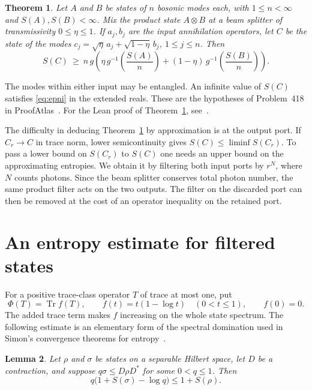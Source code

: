 \documentclass[11pt,letterpaper]{article}
\newtheorem{theorem}{Theorem}[section]
\newtheorem{lemma}[theorem]{Lemma}
\numberwithin{equation}{section}
\DeclareMathOperator{\Tr}{Tr}
\begin{document}
\begin{theorem}\label{thm:main}
Let $A$ and $B$ be states of $n$ bosonic modes each, with $1\le n<\infty$
and $S(A),S(B)<\infty$. Mix the product state $A\otimes B$ at a beam
splitter of transmissivity $0\le\eta\le1$. If $a_j,b_j$ are the input
annihilation operators, let $C$ be the state of the modes
$c_j=\sqrt{\eta}\,a_j+\sqrt{1-\eta}\,b_j$, $1\le j\le n$. Then
\begin{equation}\label{eq:epni}
 S(C)\ \ge\ n\,g\!\left(
   \eta\,g^{-1}\!\left(\frac{S(A)}{n}\right)
   +(1-\eta)\,g^{-1}\!\left(\frac{S(B)}{n}\right)\right).
\end{equation}
\end{theorem}

The modes within either input may be entangled. An infinite value of
$S(C)$ satisfies \eqref{eq:epni} in the extended reals. These are the
hypotheses of Problem~418 in ProofAtlas~\cite{atlas}.
For the Lean proof of Theorem~\ref{thm:main}, see~\cite{lean}.

The difficulty in deducing Theorem~\ref{thm:main} by approximation is
at the output port. If $C_r\to C$ in trace norm, lower semicontinuity
gives $S(C)\le\liminf S(C_r)$. To pass a lower bound on $S(C_r)$ to
$S(C)$ one needs an upper bound on the approximating entropies. We
obtain it by filtering both input ports by $r^N$, where $N$ counts
photons. Since the beam splitter conserves total photon number, the
same product filter acts on the two outputs. The filter on the
discarded port can then be removed at the cost of an operator
inequality on the retained port.

\section{An entropy estimate for filtered states}

For a positive trace-class operator $T$ of trace at most one, put
\[
 \Phi(T)=\Tr f(T),\qquad f(t)=t(1-\log t)\quad(0<t\le1),\qquad f(0)=0.
\]
The added trace term makes $f$ increasing on the whole state spectrum.
The following estimate is an elementary form of the spectral
domination used in Simon's convergence theorems for
entropy~\cite[Appendix, Theorems~A.2--A.4]{simon}.

\begin{lemma}\label{lem:entropy}
Let $\rho$ and $\sigma$ be states on a separable Hilbert space, let
$D$ be a contraction, and suppose $q\sigma\le D\rho D^*$ for some
$0<q\le1$. Then
\begin{equation}\label{eq:bound}
 q\bigl(1+S(\sigma)-\log q\bigr)\le 1+S(\rho).
\end{equation}
\end{lemma}
\end{document}
